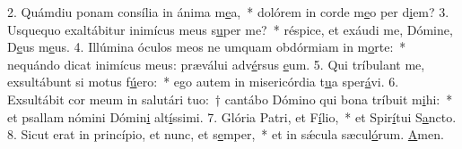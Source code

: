 2. Quámdiu ponam consília in ánima m\uline{e}a,~* dolórem in corde m\uline{e}o per d\uline{i}em?
3. Usquequo exaltábitur inimícus meus s\uline{u}per me?~* réspice, et exáudi me, Dómine, D\uline{e}us m\uline{e}us.
4. Illúmina óculos meos ne umquam obdórmiam in m\uline{o}rte:~* nequándo dicat inimícus meus: præválui adv\uline{é}rsus \uline{e}um.
5. Qui tríbulant me, exsultábunt si motus f\uline{ú}ero:~* ego autem in misericórdia t\uline{u}a sper\uline{á}vi.
6. Exsultábit cor meum in salutári tuo:~† cantábo Dómino qui bona tríbuit m\uline{i}hi:~* et psallam nómini Dómin\uline{i} alt\uline{í}ssimi.
7. Glória Patri, et F\uline{í}lio,~* et Spir\uline{í}tui S\uline{a}ncto.
8. Sicut erat in princípio, et nunc, et s\uline{e}mper,~* et in sǽcula sæcul\uline{ó}rum. \uline{A}men.
